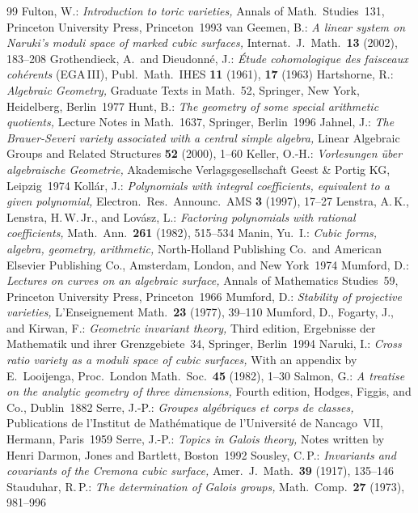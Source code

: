 \documentclass[reqno]{amsart}
\newcommand{\br}{ }
\newcommand{\brr}{, }
\theoremstyle{definition}
\theoremstyle{remark}
\numberwithin{equation}{section}
\begin{document}
\begin{thebibliography}{99}
Fulton, W.: {\em Introduction to toric varieties,} Annals of Math.\ Studies~131, Prince\-ton University Press, Princeton~1993
van Geemen, B.: {\em A linear system on Naruki's moduli space of marked cubic surfaces,} Internat.\ J.\ Math.\ {\bf 13}\br(2002)\brr183--208
Grothendieck, A.\ and Dieudonn\'e, J.: {\em \'Etude cohomologique
des faisceaux coh\'erents\/} (EGA\,III), Publ.\ Math.\ IHES {\bf 11}\br(1961), {\bf 17}\br(1963)
Hartshorne, R.: {\em Algebraic Geometry,} Graduate Texts in Math.~52, Sprin\-ger,  New York, Heidelberg, Berlin~1977
Hunt, B.: {\em The geometry of some special arithmetic quotients,}
Lecture Notes in Math.~1637, Springer, Berlin~1996
Jahnel, J.: {\em The Brauer-Severi variety associated with a central simple al\-ge\-bra,} Linear Algebraic Groups and Related Structures {\bf 52}\br(2000)\brr1--60
Keller, O.-H.: {\em Vorlesungen \"uber algebraische Geometrie,} Akademische Ver\-lags\-gesellschaft Geest \& Portig KG, Leipzig~1974
Koll\'ar, J.: {\em Polynomials with integral coefficients, equivalent to a given polynomial,} Electron.\ Res.\ Announc.\ AMS {\bf 3}\br(1997)\brr17--27
Lenstra, A.\,K., Lenstra, H.\,W.\,Jr., and Lov\'asz, L.: {\em Factoring polynomials with rational coefficients,} Math.\ Ann.\ {\bf 261}\br(1982)\brr515--534
Manin, Yu.~I.: {\em Cubic forms, algebra, geometry, arithmetic,} North-Holland Publishing Co.\ and American Elsevier Publishing Co., Amsterdam, London, and New York~1974
Mumford, D.: {\em Lectures on curves on an algebraic surface,} Annals of Mathematics Studies~59, Princeton University Press, Princeton~1966
Mumford, D.: {\em Stability of projective varieties,} L'Enseignement Math.\ {\bf 23}\br(1977)\brr39--110
Mumford, D., Fogarty, J., and Kirwan, F.: {\em Geometric invariant theory,}
Third edition, Ergebnisse der Mathematik und ihrer Grenzgebiete~34, Sprin\-ger, Berlin~1994
Naruki, I.: {\em Cross ratio variety as a moduli space of cubic surfaces,} With an appendix by E.~Looijenga, Proc.\ London Math.\ Soc.\ {\bf 45}\br(1982)\brr1--30
Salmon, G.: {\em A treatise on the analytic geometry of three dimensions,} Fourth edition, Hodges, Figgis, and Co., Dublin~1882
Serre, J.-P.: {\em Groupes alg\'ebriques et corps de classes,} Publications de l'Institut de Math\'e\-matique de l'Universit\'e de Nancago~VII, Hermann, Paris~1959
Serre, J.-P.: {\em Topics in Galois theory,} Notes written by Henri Darmon, Jones and Bartlett, Boston~1992
Sousley, C.\,P.: {\em Invariants and covariants of the Cremona cubic surface,} Amer.\ J.\ Math.\ {\bf 39}\br(1917)\brr135--146
Stauduhar, R.\,P.: {\em The determination of Galois groups,} Math.\ Comp.\ {\bf 27}\br(1973)\brr981--996
\end{thebibliography}
\end{document}
